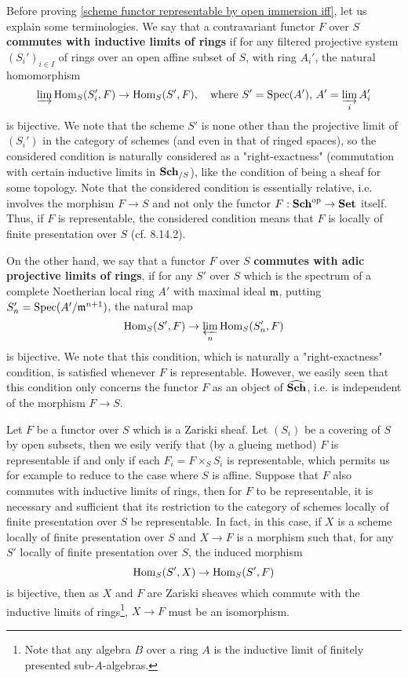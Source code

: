 Before proving \cref{scheme functor representable by open immersion iff}, let us explain some terminologies. We say that a contravariant functor $F$ over $S$ \textbf{commutes with inductive limits of rings} if for any filtered projective system $(S_i')_{i\in I}$ of rings over an open affine subset of $S$, with ring $A_i'$, the natural homomorphism
\begin{equation}\label{scheme presheaf commutes with inductive limit of rings-1}
\varinjlim \mathrm{Hom}_{S}(S_i',F)\to \mathrm{Hom}_S(S',F),\quad \text{where $S'=\mathrm{Spec}(A')$, $A'=\varinjlim_iA_i'$}
\end{equation}
is bijective. We note that the scheme $S'$ is none other than the projective limit of $(S_i')$ in the category of schemes (and even in that of ringed spaces), so the considered condition is naturally considered as a "right-exactness" (commutation with certain inductive limits in $\mathbf{Sch}_{/S}$), like the condition of being a sheaf for some topology. Note that the considered condition is essentially relative, i.e. involves the morphism $F\to S$ and not only the functor $F:\mathbf{Sch}^{\mathrm{op}}\to\mathbf{Set}$ itself. Thus, if $F$ is representable, the considered condition means that $F$ is locally of finite presentation over $S$ (cf. \cite{EGA4-3} 8.14.2).\par
On the other hand, we say that a functor $F$ over $S$ \textbf{commutes with adic projective limits of rings}, if for any $S'$ over $S$ which is the spectrum of a complete Noetherian local ring $A'$ with maximal ideal $\mathfrak{m}$, putting $S_n'=\mathrm{Spec}(A'/\mathfrak{m}^{n+1})$, the natural map
\begin{equation}\label{scheme presheaf commutes with inductive limit of rings-2}
\mathrm{Hom}_S(S',F)\to\varprojlim_n\mathrm{Hom}_S(S_n',F)
\end{equation}
is bijective. We note that this condition, which is naturally a "right-exactness" condition, is satisfied whenever $F$ is representable. However, we easily seen that this condition only concerns the functor $F$ as an object of $\widehat{\mathbf{Sch}}$, i.e. is independent of the morphism $F\to S$.

\begin{remark}\label{scheme functor commutes with inductive limit of rings representable iff on local fp}
Let $F$ be a functor over $S$ which is a Zariski sheaf. Let $(S_i)$ be a covering of $S$ by open subsets, then we esily verify that (by a glueing method) $F$ is representable if and only if each $F_i=F\times_SS_i$ is representable, which permits us for example to reduce to the case where $S$ is affine. Suppose that $F$ also commutes with inductive limits of rings, then for $F$ to be representable, it is necessary and sufficient that its restriction to the category of schemes locally of finite presentation over $S$ be representable. In fact, in this case, if $X$ is a scheme locally of finite presentation over $S$ and $X\to F$ is a morphism such that, for any $S'$ locally of finite presentation over $S$, the induced morphism
\[\mathrm{Hom}_S(S',X)\to\mathrm{Hom}_S(S',F)\]
is bijective, then as $X$ and $F$ are Zariski sheaves which commute with the inductive limits of rings\footnote{Note that any algebra $B$ over a ring $A$ is the inductive limit of finitely presented sub-$A$-algebras.}, $X\to F$ must be an isomorphism.
\end{remark}

